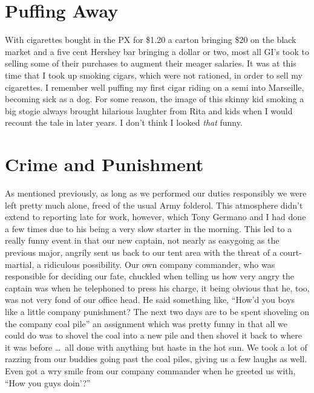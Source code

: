 \documentclass[../m3y]{subfiles}
\begin{document}
\section{Puffing Away}
With cigarettes bought in the PX for \$1.20 a carton bringing \$20 on the black market and a five cent Hershey bar bringing a dollar or two, most all GI's took to selling some of their purchases to augment their meager salaries. It was at this time that I took up smoking cigars, which were not rationed, in order to sell my cigarettes. I remember well puffing my first cigar riding on a semi into Marseille, becoming sick as a dog. For some reason, the image of this skinny kid smoking a big stogie always brought hilarious laughter from Rita and kids when I would recount the tale in later years. I don't think I looked \emph{that} funny.

\section{Crime and Punishment}
As mentioned previously, as long as we performed our duties responsibly we were left pretty much alone, freed of the usual Army folderol. This atmosphere didn't extend to reporting late for work, however, which Tony Germano and I had done a few times due to his being a very slow starter in the morning. This led to a really funny event in that our new captain, not nearly as easygoing as the previous major, angrily sent us back to our tent area with the threat of a court-martial, a ridiculous possibility. Our own company commander, who was responsible for deciding our fate, chuckled when telling us how very angry the captain was when he telephoned to press his charge, it being obvious that he, too, was not very fond of our office head. He said something like, ``How'd you boys like a little company punishment? The next two days are to be spent shoveling on the company coal pile'' an assignment which was pretty funny in that all we could do was to shovel the coal into a new pile and then shovel it back to where it was before \ldots\ all done with anything but haste in the hot sun. We took a lot of razzing from our buddies going past the coal piles, giving us a few laughs as well. Even got a wry smile from our company commander when he greeted us with, ``How you guys doin'?''
\end{document}

